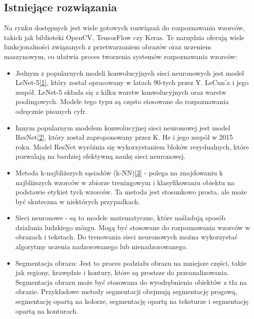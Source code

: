 \documentclass[a4paper, titleauthor]{mwart}
\begin{document}
\subsection{Istniejące rozwiązania}
Na rynku dostępnych jest wiele gotowych rozwiązań do rozpoznawania wzorców, takich jak biblioteki OpenCV, TensorFlow czy Keras. Te narzędzia oferują wiele funkcjonalności związanych z przetwarzaniem obrazów oraz uczeniem maszynowym, co ułatwia proces tworzenia systemów rozpoznawania wzorców:
\newline
\begin{itemize}
    \item Jednym z popularnych modeli konwolucyjnych sieci neuronowych jest model LeNet-5\hyperref[1]{[1]}, który został opracowany w latach 90-tych przez Y. LeCun'a i jego zespół. LeNet-5 składa się z kilku warstw konwolucyjnych oraz warstw poolingowych. Modele tego typu są często stosowane do rozpoznawania odręcznie pisanych cyfr.
\newline
    \item Innym popularnym modelem konwolucyjnej sieci neuronowej jest model ResNet\hyperref[2]{[2]}, który został zaproponowany przez K. He i jego zespół w 2015 roku. Model ResNet wyróżnia się wykorzystaniem bloków rezydualnych, które pozwalają na bardziej efektywną naukę sieci neuronowej.
\newline
    \item Metoda k-najbliższych sąsiadów (k-NN)\hyperref[3]{[3]} - polega na znajdowaniu k najbliższych wzorców w zbiorze treningowym i klasyfikowaniu obiektu na podstawie etykiet tych wzorców. Ta metoda jest stosunkowo prosta, ale może być skuteczna w niektórych przypadkach.
\newline
    \item Sieci neuronowe - są to modele matematyczne, które naśladują sposób działania ludzkiego mózgu. Mogą być stosowane do rozpoznawania wzorców w obrazach i tekstach. Do trenowania sieci neuronowych można wykorzystać algorytmy uczenia nadzorowanego lub nienadzorowanego. 
\newline
    \item Segmentacja obrazu: Jest to proces podziału obrazu na mniejsze części, takie jak regiony, krawędzie i kontury, które są prostsze do przeanalizowania. Segmentacja obrazu może być stosowana do wyodrębnienia obiektów z tła na obrazie. Przykładowe metody segmentacji obejmują segmentację progową, segmentację opartą na kolorze, segmentację opartą na teksturze i segmentację opartą na konturach.
\newline

\end{itemize}
\end{document}
